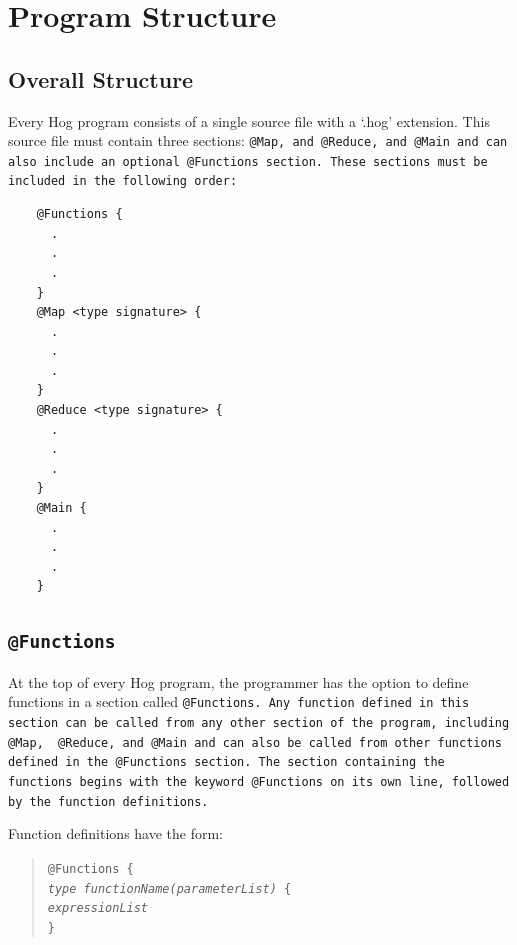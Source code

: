 \documentclass{article}
\begin{document}

\section{Program Structure} %
\label{sec:program_structure}

\subsection{Overall Structure} %
\label{sub:overall_structure}

Every Hog program consists of a single source file with a ‘.hog’ extension. This
source file must contain three sections: \tt @Map\rm, and \tt @Reduce\rm, and
\tt @Main \rm and can also include an optional \tt @Functions \rm section. These
sections must be included in the following order:

\begin{verbatim}
    @Functions {
      .
      .
      .
    }
    @Map <type signature> {
      .
      .
      .
    }
    @Reduce <type signature> {
      .
      .
      .
    }
    @Main {
      .
      .
      .
    }
\end{verbatim}


\subsection{\tt @Functions\rm} %
\label{sub:tt_functionsrm}

At the top of every Hog program, the programmer has the option to define functions
in a section called \tt @Functions\rm. Any function defined in this section can be
called from any other section of the program, including \tt @Map\rm, \tt
@Reduce\rm, and \tt @Main \rm and can also be called from other functions defined
in the \tt @Functions \rm section. The section containing the functions begins
with the keyword \tt @Functions \rm on its own line, followed by the function
definitions.

Function definitions have the form:

\begin{quotation}
  \tt @Functions \{ \rm \\
  \indent \emph{type functionName(parameterList)} \tt \{ \rm \\
  \indent \indent \emph{expressionList} \\
  \indent \tt \}
\end{quotation}
\end{document}
